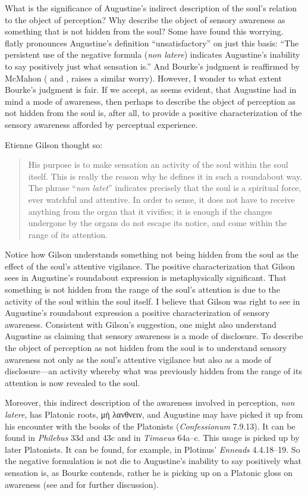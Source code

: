\documentclass[12pt]{article}
\begin{document}
What is the significance of Augustine's indirect description of the soul's relation to the object of perception? Why describe the object of sensory awareness as something that is not hidden from the soul? Some have found this worrying. \citet[112]{Bourke:1947jk} flatly pronounces Augustine's definition ``unsatisfactory'' on just this basis: ``The persistent use of the negative formula (\emph{non latere}) indicates Augustine's inability to say positively just what sensation is.'' And Bourke's judgment is reaffirmed by McMahon (\citeyear[104, n.1]{McMahon:1947dn} and \citealt[167--8]{Gannon:1956aa}, raises a similar worry). However, I wonder to what extent Bourke's judgment is fair. If we accept, as seems evident, that Augustine had in mind a mode of awareness, then perhaps to describe the object of perception as not hidden from the soul is, after all, to provide a positive characterization of the sensory awareness afforded by perceptual experience.

Etienne Gilson thought so:
\begin{quote}
	His purpose is to make sensation an activity of the soul within the soul itself. This is really the reason why he defines it in such a roundabout way. The phrase ``\emph{non latet}'' indicates precisely that the soul is a spiritual force, ever watchful and attentive. In order to sense, it does not have to receive anything from the organ that it vivifies; it is enough if the changes undergone by the organs do not escape its notice, and come within the range of its attention. \citep[63]{Gilson:1961ec}
\end{quote}
Notice how Gilson understands something not being hidden from the soul as the effect of the soul's attentive vigilance. The positive characterization that Gilson sees in Augustine's roundabout expression is metaphysically significant. That something is not hidden from the range of the soul's attention is due to the activity of the soul within the soul itself. I believe that Gilson was right to see in Augustine's roundabout expression a positive characterization of sensory awareness. Consistent with Gilson's suggestion, one might also understand Augustine as claiming that sensory awareness is a mode of disclosure. To describe the object of perception as not hidden from the soul is to understand sensory awareness not only as the soul's attentive vigilance but also as a mode of disclosure---an activity whereby what was previously hidden from the range of its attention is now revealed to the soul.

Moreover, this indirect description of the awareness involved in perception, \emph{non latere}, has Platonic roots, {\sbl μή λανθνειν}, and Augustine may have picked it up from his encounter with the books of the Platonists (\emph{Confessionum} 7.9.13). It can be found in \emph{Philebus} 33d and 43c and in \emph{Timaeus} 64a--c. This usage is picked up by later Platonists. It can be found, for example, in Plotinus' \emph{Enneads} 4.4.18--19. So the negative formulation is not die to Augustine's inability to say positively what sensation is, as Bourke contends, rather he is picking up on a Platonic gloss on awareness (see \citealt[86 n15]{ODaly:1987fq} and \citealt[275 n61]{Brittain:2002hl} for further discussion).
\end{document}
